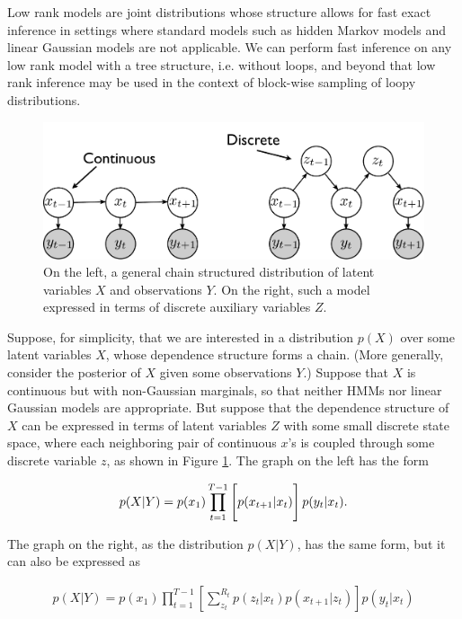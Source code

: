 \documentclass[11pt]{article}
\begin{document}
Low rank models are joint distributions whose structure allows for fast exact inference in settings where standard models such as hidden Markov models and linear Gaussian models are not applicable. We can perform fast inference on any low rank model with a tree structure, i.e. without loops, and beyond that low rank inference may be used in the context of block-wise sampling of loopy distributions. 

\begin{figure}[h]
\centering
\includegraphics[scale=0.35]{../fig/aux_vars}
\caption{On the left, a general chain structured distribution of latent variables $X$ and observations $Y$. On the right, such a model expressed in terms of discrete auxiliary variables $Z$.}
\label{fig:aux_vars}
\end{figure}

Suppose, for simplicity, that we are interested in a distribution $p(X)$ over some latent variables $X$, whose dependence structure forms a chain. (More generally, consider the posterior of $X$ given some observations $Y$.) Suppose that $X$ is continuous but with non-Gaussian marginals, so that neither HMMs nor linear Gaussian models are appropriate. But suppose that the dependence structure of $X$ can be expressed in terms of latent variables $Z$ with some small discrete state space, where each neighboring pair of continuous $x$'s is coupled through some discrete variable $z$, as shown in Figure \ref{fig:aux_vars}. The graph on the left has the form

\begin{align*}
p(X|Y)=p(x_1)\prod_{t=1}^{T-1}\left[\vphantom{\sum_{i}^{J}}p(x_{t+1}|x_t)\right]p(y_t|x_t).
\end{align*}

\noindent The graph on the right, as the distribution $p(X|Y)$, has the same form, but it can also be expressed as

\begin{align*}
p(X|Y)=p(x_1)\prod_{t=1}^{T-1}\left[\sum_{z_t}^{R_t}p(z_t|x_t)p(x_{t+1}|z_t)\right]p(y_t|x_t)
\end{align*}
\end{document}
